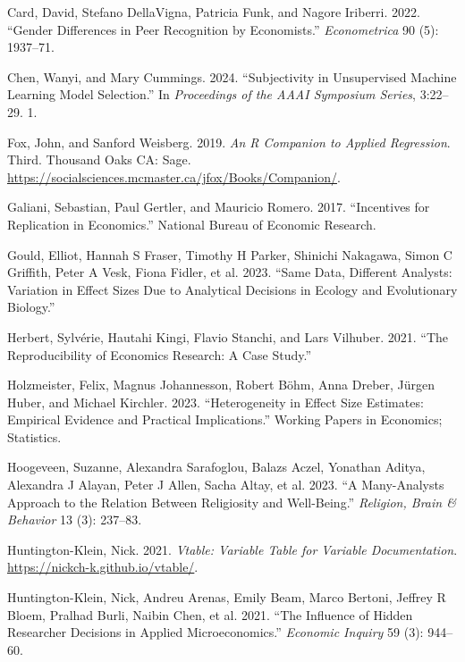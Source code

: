 \documentclass[
  letterpaper,
  DIV=11,
  numbers=noendperiod]{scrartcl}
\newlength{\cslhangindent}
\newenvironment{CSLReferences}[2] %
 {\begin{list}{}{%
  \setlength{\itemindent}{0pt}
  \setlength{\leftmargin}{0pt}
  \setlength{\parsep}{0pt}
  \ifodd #1
   \setlength{\leftmargin}{\cslhangindent}
   \setlength{\itemindent}{-1\cslhangindent}
  \fi
  \setlength{\itemsep}{#2\baselineskip}}}
 {\end{list}}
\begin{document}
\begin{CSLReferences}{1}{0}
Card, David, Stefano DellaVigna, Patricia Funk, and Nagore Iriberri.
2022. {``Gender Differences in Peer Recognition by Economists.''}
\emph{Econometrica} 90 (5): 1937--71.

Chen, Wanyi, and Mary Cummings. 2024. {``Subjectivity in Unsupervised
Machine Learning Model Selection.''} In \emph{Proceedings of the AAAI
Symposium Series}, 3:22--29. 1.

Fox, John, and Sanford Weisberg. 2019. \emph{An {R} Companion to Applied
Regression}. Third. Thousand Oaks {CA}: Sage.
\url{https://socialsciences.mcmaster.ca/jfox/Books/Companion/}.

Galiani, Sebastian, Paul Gertler, and Mauricio Romero. 2017.
{``Incentives for Replication in Economics.''} National Bureau of
Economic Research.

Gould, Elliot, Hannah S Fraser, Timothy H Parker, Shinichi Nakagawa,
Simon C Griffith, Peter A Vesk, Fiona Fidler, et al. 2023. {``Same Data,
Different Analysts: Variation in Effect Sizes Due to Analytical
Decisions in Ecology and Evolutionary Biology.''}

Herbert, Sylvérie, Hautahi Kingi, Flavio Stanchi, and Lars Vilhuber.
2021. {``The Reproducibility of Economics Research: A Case Study.''}

Holzmeister, Felix, Magnus Johannesson, Robert Böhm, Anna Dreber, Jürgen
Huber, and Michael Kirchler. 2023. {``Heterogeneity in Effect Size
Estimates: Empirical Evidence and Practical Implications.''} Working
Papers in Economics; Statistics.

Hoogeveen, Suzanne, Alexandra Sarafoglou, Balazs Aczel, Yonathan Aditya,
Alexandra J Alayan, Peter J Allen, Sacha Altay, et al. 2023. {``A
Many-Analysts Approach to the Relation Between Religiosity and
Well-Being.''} \emph{Religion, Brain \& Behavior} 13 (3): 237--83.

Huntington-Klein, Nick. 2021. \emph{Vtable: Variable Table for Variable
Documentation}. \url{https://nickch-k.github.io/vtable/}.

Huntington-Klein, Nick, Andreu Arenas, Emily Beam, Marco Bertoni,
Jeffrey R Bloem, Pralhad Burli, Naibin Chen, et al. 2021. {``The
Influence of Hidden Researcher Decisions in Applied Microeconomics.''}
\emph{Economic Inquiry} 59 (3): 944--60.


\end{CSLReferences}
\end{document}

